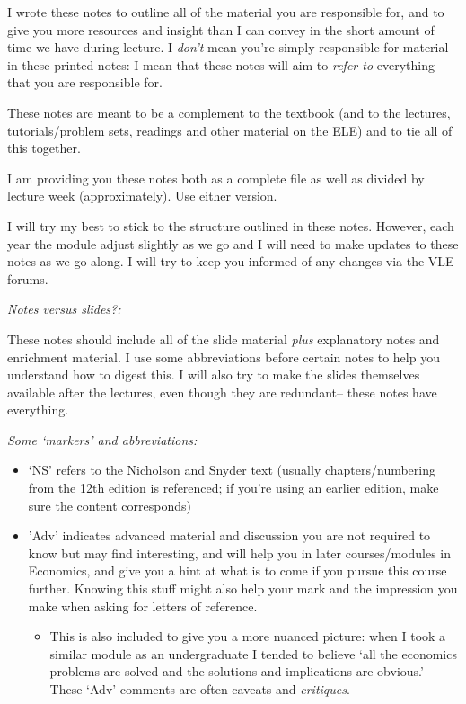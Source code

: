 \documentclass[]{article}
\providecommand{\tightlist}{%
  \setlength{\itemsep}{0pt}\setlength{\parskip}{0pt}}
\begin{document}
I wrote these notes to outline all of the material you are responsible for, and to give you more resources and insight than I can convey in the short amount of time we have during lecture. I \emph{don't} mean you're simply responsible for material in these printed notes: I mean that these notes will aim to \emph{refer to} everything that you are responsible for.

These notes are meant to be a complement to the textbook (and to the lectures, tutorials/problem sets, readings and other material on the ELE) and to tie all of this together.

I am providing you these notes both as a complete file as well as divided by lecture week (approximately). Use either version.

I will try my best to stick to the structure outlined in these notes. However, each year the module adjust slightly as we go and I will need to make updates to these notes as we go along. I will try to keep you informed of any changes via the VLE forums.

\bigskip

\emph{Notes versus slides?:}

These notes should include all of the slide material \emph{plus} explanatory notes and enrichment material. I use some abbreviations before certain notes to help you understand how to digest this. I will also try to make the slides themselves available after the lectures, even though they are redundant-- these notes have everything.

\bigskip

\emph{Some `markers' and abbreviations:}

\begin{itemize}
\tightlist
\item
  `NS' refers to the Nicholson and Snyder text (usually chapters/numbering from the 12th edition is referenced; if you're using an earlier edition, make sure the content corresponds)
\end{itemize}

\begin{itemize}
\tightlist
\item
  \textcolor{RawSienna}{'Adv'} indicates advanced material and discussion you are not required to know but may find interesting, and will help you in later courses/modules in Economics, and give you a hint at what is to come if you pursue this course further. Knowing this stuff might also help your mark and the impression you make when asking for letters of reference.

  \begin{itemize}
  \tightlist
  \item
    This is also included to give you a more nuanced picture: when I took a similar module as an undergraduate I tended to believe `all the economics problems are solved and the solutions and implications are obvious.' These `Adv' comments are often caveats and \emph{critiques}.
  \end{itemize}
\end{itemize}
\end{document}
